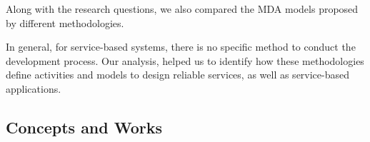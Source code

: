 
Along with the research questions, we also compared the MDA models 
proposed by different methodologies. 

In general, for service-based systems, there is no specific method to conduct
the development process. Our analysis, helped us to identify how these methodologies define activities and models to design reliable
services, as well as service-based applications.

\subsection{Concepts and Works}
\label{subsec:methodology_concepts}

